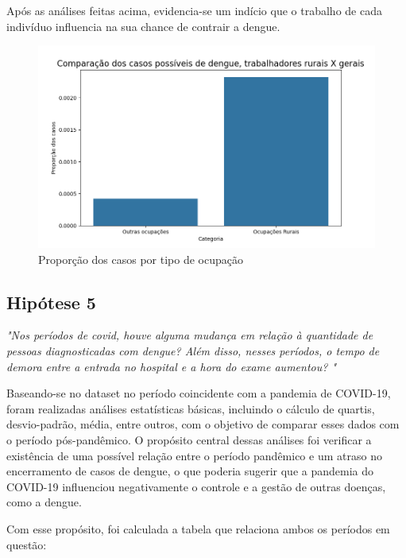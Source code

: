 \documentclass[a4paper,12pt]{article}
\begin{document}
Após as análises feitas acima, evidencia-se um indício que o trabalho de cada indivíduo influencia na sua chance de contrair a dengue.

\begin{figure}[H]
    \centering
    \includegraphics[width=1.0\textwidth]{images/plot_hp4.png}
    \caption{Proporção dos casos por tipo de ocupação}
    \label{fig:occupation}
\end{figure}

    
\subsection{Hipótese 5}
\emph{"Nos períodos de covid, houve alguma mudança em relação à quantidade de pessoas diagnosticadas com dengue? Além disso, nesses períodos, o tempo de demora entre a entrada no hospital e a hora do exame aumentou?
"}

Baseando-se no dataset no período coincidente com a pandemia de COVID-19, foram realizadas análises estatísticas básicas, incluindo o cálculo de quartis, desvio-padrão, média, entre outros, com o objetivo de comparar esses dados com o período pós-pandêmico. O propósito central dessas análises foi verificar a existência de uma possível relação entre o período pandêmico e um atraso no encerramento de casos de dengue, o que poderia sugerir que a pandemia do COVID-19 influenciou negativamente o controle e a gestão de outras doenças, como a dengue.

Com esse propósito, foi calculada a tabela que relaciona ambos os períodos em questão:
\end{document}
